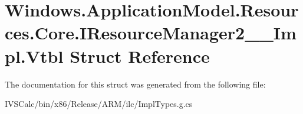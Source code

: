 \hypertarget{struct_windows_1_1_application_model_1_1_resources_1_1_core_1_1_i_resource_manager2_____impl_1_1_vtbl}{}\section{Windows.\+Application\+Model.\+Resources.\+Core.\+I\+Resource\+Manager2\+\_\+\+\_\+\+Impl.\+Vtbl Struct Reference}
\label{struct_windows_1_1_application_model_1_1_resources_1_1_core_1_1_i_resource_manager2_____impl_1_1_vtbl}


The documentation for this struct was generated from the following file\+:\begin{DoxyCompactItemize}
\item 
I\+V\+S\+Calc/bin/x86/\+Release/\+A\+R\+M/ilc/Impl\+Types.\+g.\+cs\end{DoxyCompactItemize}
